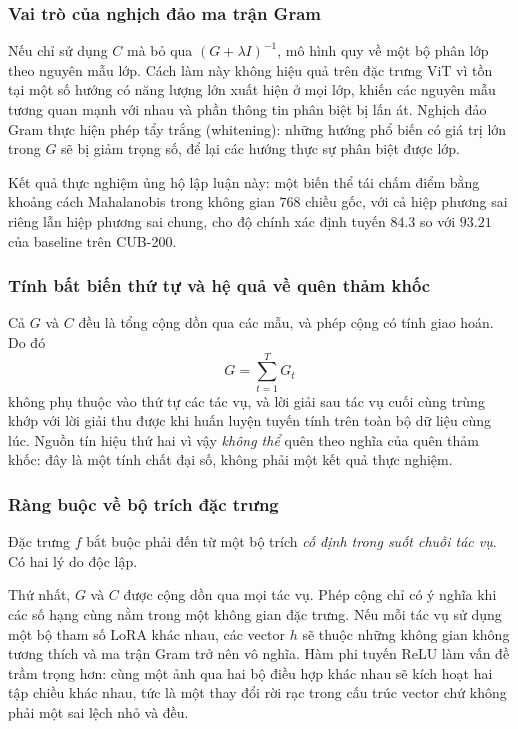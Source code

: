 \documentclass[11pt,a4paper]{article}
\begin{document}
\subsubsection{Vai trò của nghịch đảo ma trận Gram}

Nếu chỉ sử dụng $C$ mà bỏ qua $(G + \lambda I)^{-1}$, mô hình quy về một bộ phân
lớp theo nguyên mẫu lớp. Cách làm này không hiệu quả trên đặc trưng ViT vì tồn
tại một số hướng có năng lượng lớn xuất hiện ở mọi lớp, khiến các nguyên mẫu
tương quan mạnh với nhau và phần thông tin phân biệt bị lấn át. Nghịch đảo Gram
thực hiện phép tẩy trắng (whitening): những hướng phổ biến có giá trị lớn trong
$G$ sẽ bị giảm trọng số, để lại các hướng thực sự phân biệt được lớp.

Kết quả thực nghiệm ủng hộ lập luận này: một biến thể tái chấm điểm bằng khoảng
cách Mahalanobis trong không gian $768$ chiều gốc, với cả hiệp phương sai riêng
lẫn hiệp phương sai chung, cho độ chính xác định tuyến $84.3$ so với $93.21$ của
baseline trên CUB-200.

\subsubsection{Tính bất biến thứ tự và hệ quả về quên thảm khốc}
\label{sec:order}

Cả $G$ và $C$ đều là tổng cộng dồn qua các mẫu, và phép cộng có tính giao hoán.
Do đó
\begin{equation}
G = \sum_{t=1}^{T} G_t
\end{equation}
không phụ thuộc vào thứ tự các tác vụ, và lời giải sau tác vụ cuối cùng trùng
khớp với lời giải thu được khi huấn luyện tuyến tính trên toàn bộ dữ liệu cùng
lúc. Nguồn tín hiệu thứ hai vì vậy \emph{không thể} quên theo nghĩa của quên thảm
khốc: đây là một tính chất đại số, không phải một kết quả thực nghiệm.

\subsubsection{Ràng buộc về bộ trích đặc trưng}
\label{sec:fixed-extractor}

Đặc trưng $f$ bắt buộc phải đến từ một bộ trích \emph{cố định trong suốt chuỗi
tác vụ}. Có hai lý do độc lập.

Thứ nhất, $G$ và $C$ được cộng dồn qua mọi tác vụ. Phép cộng chỉ có ý nghĩa khi
các số hạng cùng nằm trong một không gian đặc trưng. Nếu mỗi tác vụ sử dụng một
bộ tham số LoRA khác nhau, các vector $h$ sẽ thuộc những không gian không tương
thích và ma trận Gram trở nên vô nghĩa. Hàm phi tuyến ReLU làm vấn đề trầm trọng
hơn: cùng một ảnh qua hai bộ điều hợp khác nhau sẽ kích hoạt hai tập chiều khác
nhau, tức là một thay đổi rời rạc trong cấu trúc vector chứ không phải một sai
lệch nhỏ và đều.
\end{document}
